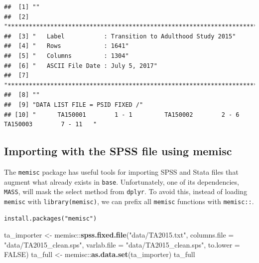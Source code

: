 \documentclass[]{book}
\newenvironment{Shaded}{\begin{snugshade}}{\end{snugshade}}
\newcommand{\KeywordTok}[1]{\textcolor[rgb]{0.13,0.29,0.53}{\textbf{{#1}}}}
\newcommand{\DataTypeTok}[1]{\textcolor[rgb]{0.13,0.29,0.53}{{#1}}}
\newcommand{\StringTok}[1]{\textcolor[rgb]{0.31,0.60,0.02}{{#1}}}
\newcommand{\OtherTok}[1]{\textcolor[rgb]{0.56,0.35,0.01}{{#1}}}
\newcommand{\NormalTok}[1]{{#1}}
\theoremstyle{definition}
\theoremstyle{definition}
\theoremstyle{remark}
\begin{document}
\begin{verbatim}
##  [1] ""                                                                                           
##  [2] "**************************************************************************"                 
##  [3] "   Label           : Transition to Adulthood Study 2015"                                    
##  [4] "   Rows            : 1641"                                                                  
##  [5] "   Columns         : 1304"                                                                  
##  [6] "   ASCII File Date : July 5, 2017"                                                          
##  [7] "*************************************************************************."                 
##  [8] ""                                                                                           
##  [9] "DATA LIST FILE = PSID FIXED /"                                                              
## [10] "      TA150001        1 - 1         TA150002        2 - 6         TA150003        7 - 11   "
\end{verbatim}

\subsection{Importing with the SPSS file using
memisc}\label{importing-with-the-spss-file-using-memisc}

The \texttt{memisc} package has useful tools for importing SPSS and
Stata files that augment what already exists in \texttt{base}.
Unfortunately, one of its dependencies, \texttt{MASS}, will mask the
select method from \texttt{dplyr}. To avoid this, instead of loading
\texttt{memisc} with \texttt{library(memisc)}, we can prefix all
\texttt{memisc} functions with \texttt{memisc::}.

\begin{verbatim}
install.packages("memisc")
\end{verbatim}

\begin{Shaded}
\begin{Highlighting}[]
\NormalTok{ta_importer <-}\StringTok{ }\NormalTok{memisc::}\KeywordTok{spss.fixed.file}\NormalTok{(}\StringTok{"data/TA2015.txt"}\NormalTok{, }\DataTypeTok{columns.file =} \StringTok{"data/TA2015_clean.sps"}\NormalTok{, }\DataTypeTok{varlab.file =} \StringTok{"data/TA2015_clean.sps"}\NormalTok{, }\DataTypeTok{to.lower =} \OtherTok{FALSE}\NormalTok{)}
\NormalTok{ta_full <-}\StringTok{ }\NormalTok{memisc::}\KeywordTok{as.data.set}\NormalTok{(ta_importer)}
\NormalTok{ta_full}
\end{Highlighting}
\end{Shaded}
\end{document}
